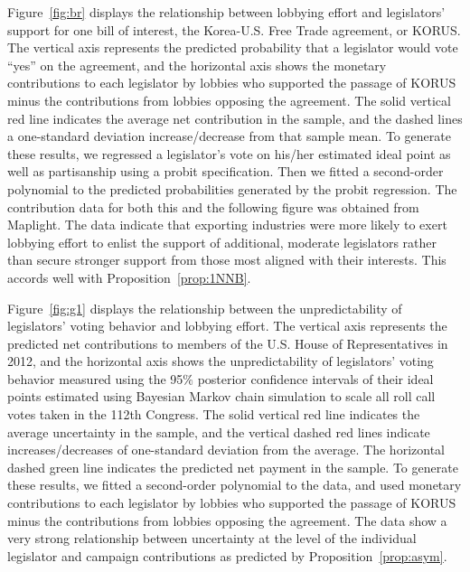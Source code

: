 \documentclass[12pt]{article}
\begin{document}
Figure~\ref{fig:br} displays the relationship between lobbying effort and legislators' support for one bill of interest, the Korea-U.S. Free Trade agreement, or KORUS. The vertical axis represents the predicted probability that a legislator would vote ``yes'' on the agreement, and the horizontal axis shows the monetary contributions to each legislator by lobbies who supported the passage of KORUS minus the contributions from lobbies opposing the agreement. The solid vertical red line indicates the average net contribution in the sample, and the dashed lines a one-standard deviation increase/decrease from that sample mean. To generate these results,  we regressed a legislator's vote on his/her estimated ideal point as well as partisanship using a probit specification. Then we fitted a second-order polynomial to the predicted probabilities generated by the probit regression. The contribution data for both this and the following figure was obtained from Maplight. The data indicate that exporting industries were more likely to exert lobbying effort to enlist the support of additional, moderate legislators rather than secure stronger support from those most aligned with their interests. This accords well with Proposition~\ref{prop:1NNB}.

Figure~\ref{fig:g1} displays the relationship between the unpredictability of legislators' voting behavior and lobbying effort. The vertical axis represents the predicted net contributions to members of the U.S. House of Representatives in 2012, and the horizontal axis shows the unpredictability of legislators' voting behavior measured using the 95$\%$ posterior confidence intervals of their ideal points estimated using Bayesian Markov chain simulation to scale all roll call votes taken in the 112th Congress. The solid vertical red line indicates the average uncertainty in the sample, and the vertical dashed red lines indicate increases/decreases of one-standard deviation from the average. The horizontal dashed green line indicates the predicted net payment in the sample. To generate these results, we fitted a second-order polynomial to the data, and used monetary contributions to each legislator by lobbies who supported the passage of KORUS minus the contributions from lobbies opposing the agreement. The data show a very strong relationship between uncertainty at the level of the individual legislator and campaign contributions as predicted by Proposition~\ref{prop:asym}.
\end{document}

